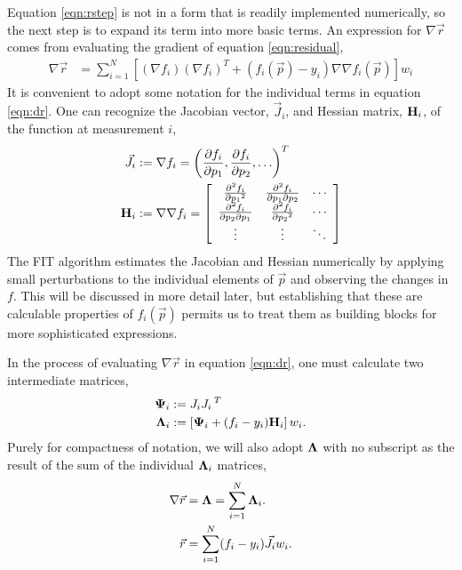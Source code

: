 \documentclass{article}
\def\p{\vec{p}}
\def\r{\vec{r}}
\def\J{\vec{J}}
\def\H{{\bf H}}
\def\LAM{{\bf \Lambda}}
\def\PSI{{\bf \Psi}}
\begin{document}
Equation \ref{eqn:rstep} is not in a form that is readily implemented numerically, so the next step is to expand its term into more basic terms.  An expression for $\nabla \r$ comes from evaluating the gradient of equation \ref{eqn:residual},
\begin{align}
\nabla \r &= \sum_{i=1}^N \left[(\nabla f_i)(\nabla f_i)^T + (f_i(\p) - y_i) \nabla\nabla f_i(\p)\right] w_i\label{eqn:dr}
\end{align}
It is convenient to adopt some notation for the individual terms in equation \ref{eqn:dr}.  One can recognize the Jacobian vector, $\J_i$, and Hessian matrix, $\H_i$, of the function at measurement $i$,
\def\arraystretch{2}
\begin{align}
\J_i &:= \nabla f_i = \left(\frac{\partial f_i}{\partial p_1}, \frac{\partial f_i}{\partial p_2}, \ldots \right)^T\\
\H_i &:= \nabla \nabla f_i =\left[ 
\begin{array}{ccc}
\frac{\partial^2 f_i}{\partial p_1{^2}} & \frac{\partial^2 f_i}{\partial p_1 \partial p_2} & \cdots \\
\frac{\partial^2 f_i}{\partial p_2 \partial p_1} & \frac{\partial^2 f_i}{\partial p_2{^2}} & \cdots \\
\vdots & \vdots & \ddots
\end{array}
\right]
\end{align}
The FIT algorithm estimates the Jacobian and Hessian numerically by applying small perturbations to the individual elements of $\p$ and observing the changes in $f$.  This will be discussed in more detail later, but establishing that these are calculable properties of $f_i(\p)$ permits us to treat them as building blocks for more sophisticated expressions.

In the process of evaluating $\nabla \r$ in equation \ref{eqn:dr}, one must calculate two intermediate matrices,
\begin{align}
\PSI_i &:= J_i J_i\,^T\label{eqn:psi}\\
\LAM_i &:= \left[\PSI_i + (f_i - y_i) \H_i\right]w_i.\label{eqn:lam}
\end{align}
Purely for compactness of notation, we will also adopt $\LAM$ with no subscript as the result of the sum of the individual $\LAM_i$ matrices,
\begin{align}
\nabla \r &= \LAM = \sum_{i=1}^N \LAM_i.\label{eqn:dr}\\
\r &= \sum_{i=1}^N (f_i - y_i) \J_i w_i.\label{eqn:r}
\end{align}
\end{document}
